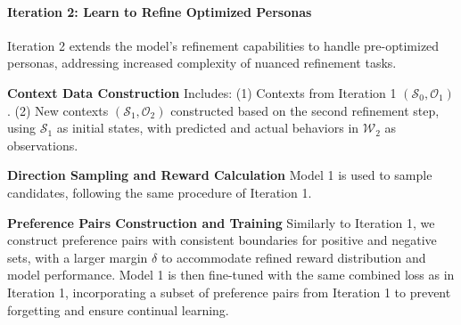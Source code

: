\paragraph{Iteration 2: Learn to Refine Optimized Personas}
Iteration 2 extends the model's refinement capabilities to handle pre-optimized personas, addressing increased complexity of nuanced refinement tasks.

\textbf{Context Data Construction}
Includes:
(1) Contexts from Iteration 1 $(\mathcal{S}_0, \mathcal{O}_1)$. (2) New contexts $(\mathcal{S}_1, \mathcal{O}_2)$ constructed based on the second refinement step, using $\mathcal{S}_1$ as initial states, with predicted and actual behaviors in $\mathcal{W}_2$ as observations.

\textbf{Direction Sampling and Reward Calculation}
Model 1 is used to sample candidates, following the same procedure of Iteration 1.

\textbf{Preference Pairs Construction and Training}
Similarly to Iteration 1, we construct preference pairs with consistent boundaries for positive and negative sets, with a larger margin $\delta$ to accommodate refined reward distribution and model performance. Model 1 is then fine-tuned with the same combined loss as in Iteration 1, incorporating a subset of preference pairs from Iteration 1 to prevent forgetting and ensure continual learning.







